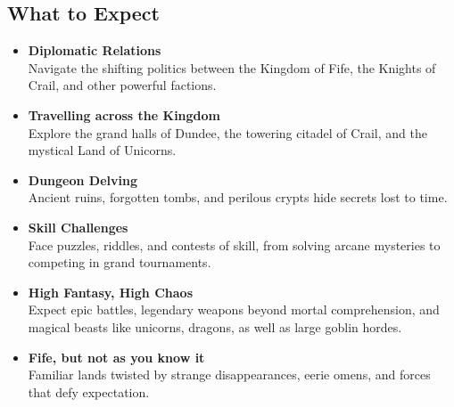 \subsection*{What to Expect}
{\entryfont\begin{itemize}
	\renewcommand\labelitemi{\textbf{\textbullet}}
	\item \textbf{Diplomatic Relations}\\Navigate the shifting politics between the Kingdom of Fife, the Knights of Crail, and other powerful factions.
	\item \textbf{Travelling across the Kingdom}\\Explore the grand halls of Dundee, the towering citadel of Crail, and the mystical Land of Unicorns.
	\item \textbf{Dungeon Delving}\\Ancient ruins, forgotten tombs, and perilous crypts hide secrets lost to time.
	\item \textbf{Skill Challenges}\\Face puzzles, riddles, and contests of skill, from solving arcane mysteries to competing in grand tournaments.
	\item \textbf{High Fantasy, High Chaos}\\Expect epic battles, legendary weapons beyond mortal comprehension, and magical beasts like unicorns, dragons, as well as large goblin hordes.
	\item \textbf{Fife, but not as you know it}\\Familiar lands twisted by strange disappearances, eerie omens, and forces that defy expectation.
\end{itemize}}
\vfill\eject
